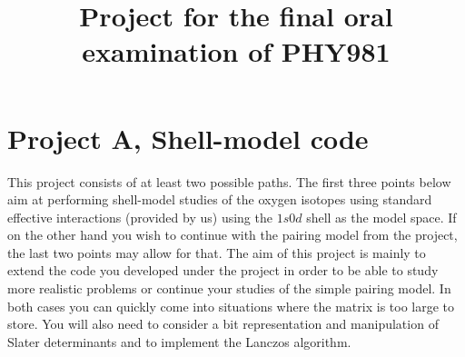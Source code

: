\documentclass[prc]{revtex4}
\begin{document}
\title{Project for the final oral examination of PHY981}
\maketitle
\section*{Project A, Shell-model code}

This project consists of at least two possible paths. The first three points below aim at performing shell-model studies of the oxygen isotopes using standard
effective interactions (provided by us) using the $1s0d$ shell as the model space.  If on the other hand you wish to continue with the pairing model from the project, the last two points may allow for that.
The aim of this project is mainly to extend the code you developed under the project in order to be able to study more realistic problems or continue your studies of the simple pairing model. In both cases you can quickly come into situations where the matrix is too large to store.  You will also need to consider a bit representation and manipulation of Slater determinants and to implement 
the Lanczos algorithm. 
\end{document}

